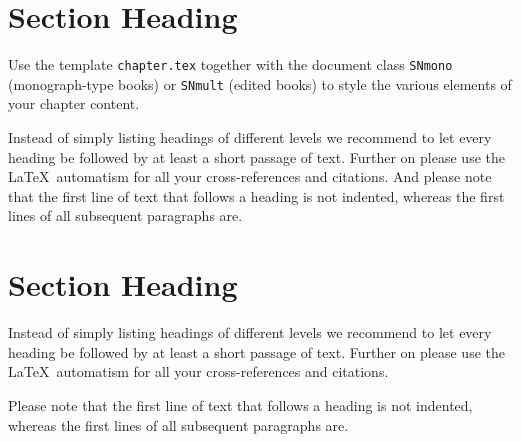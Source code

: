 

\section{Section Heading}
\label{sec:1}
Use the template \verb|chapter.tex| together with the document class \verb|SNmono| (monograph-type books) or \verb|SNmult| (edited books) to style the various elements of your chapter content.

Instead of simply listing headings of different levels we recommend to let every heading be followed by at least a short passage of text.  Further on please use the \LaTeX\ automatism for all your cross-references and citations. And please note that the first line of text that follows a heading is not indented, whereas the first lines of all subsequent paragraphs are.

\section{Section Heading}
\label{sec:2}
Instead of simply listing headings of different levels we recommend to let every heading be followed by at least a short passage of text.  Further on please use the \LaTeX\ automatism for all your cross-references and citations.

Please note that the first line of text that follows a heading is not indented, whereas the first lines of all subsequent paragraphs are.

